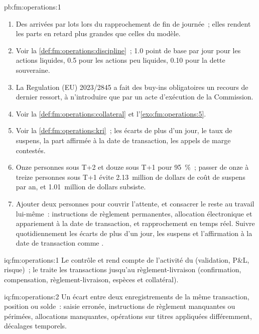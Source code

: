\begin{solution}{pb:fm:operations:1}
\begin{enumerate}
\item Des arrivées par lots lors du rapprochement de fin de journée~; elles rendent les parts en retard plus grandes que celles du modèle.
\item Voir la \cref{def:fm:operations:discipline}~; 1.0 point de base par jour pour les actions liquides, 0.5 pour les actions peu liquides, 0.10 pour la dette souveraine.
\item La Regulation (EU) 2023/2845 a fait des buy-ins obligatoires un recours de dernier ressort, à n'introduire que par un acte d'exécution de la Commission.
\item Voir la \cref{def:fm:operations:collateral} et l'\cref{exo:fm:operations:5}.
\item Voir la \cref{def:fm:operations:kri}~; les écarts de plus d'un jour, le taux de suspens, la part affirmée à la date de transaction, les appels de marge contestés.
\item Onze personnes sous T+2 et douze sous T+1 pour 95~\%~; passer de onze à treize personnes sous T+1 évite 2.13~million de dollars de coût de suspens par an,
et 1.01~million de dollars subsiste.
\item Ajouter deux personnes pour couvrir l'attente, et consacrer le reste au travail lui-même~: instructions de règlement permanentes, allocation électronique et
appariement à la date de transaction, et rapprochement en temps réel. Suivre quotidiennement les écarts de plus d'un jour, les suspens et l'affirmation à la date de transaction comme .
\end{enumerate}
\end{solution}

\begin{solution}{iq:fm:operations:1}
Le  contrôle et rend compte de l'activité du  (validation, P\&L, risque)~; le  traite les transactions
jusqu'au règlement-livraison (confirmation, compensation, règlement-livraison, espèces et collatéral).
\end{solution}

\begin{solution}{iq:fm:operations:2}
Un écart entre deux enregistrements de la même transaction, position ou solde~: saisie erronée, instructions de règlement manquantes ou périmées, allocations
manquantes, opérations sur titres appliquées différemment, décalages temporels.
\end{solution}

